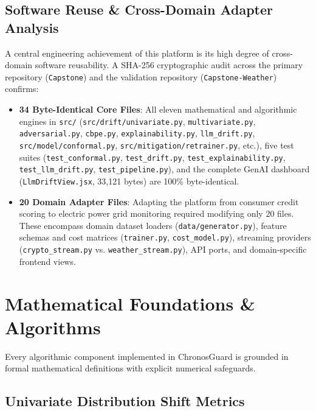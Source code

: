 \documentclass[conference]{IEEEtran}
\begin{document}
\subsection{Software Reuse \& Cross-Domain Adapter Analysis}
A central engineering achievement of this platform is its high degree of cross-domain software reusability. A SHA-256 cryptographic audit across the primary repository (\texttt{Capstone}) and the validation repository (\texttt{Capstone-Weather}) confirms:
\begin{itemize}
    \item \textbf{34 Byte-Identical Core Files}: All eleven mathematical and algorithmic engines in \texttt{src/} (\texttt{src/drift/univariate.py}, \texttt{multivariate.py}, \texttt{adversarial.py}, \texttt{cbpe.py}, \texttt{explainability.py}, \texttt{llm\_drift.py}, \texttt{src/model/conformal.py}, \texttt{src/mitigation/retrainer.py}, etc.), five test suites (\texttt{test\_conformal.py}, \texttt{test\_drift.py}, \texttt{test\_explainability.py}, \texttt{test\_llm\_drift.py}, \texttt{test\_pipeline.py}), and the complete GenAI dashboard (\texttt{LlmDriftView.jsx}, 33,121 bytes) are 100\% byte-identical.
    \item \textbf{20 Domain Adapter Files}: Adapting the platform from consumer credit scoring to electric power grid monitoring required modifying only 20 files. These encompass domain dataset loaders (\texttt{data/generator.py}), feature schemas and cost matrices (\texttt{trainer.py}, \texttt{cost\_model.py}), streaming providers (\texttt{crypto\_stream.py} vs. \texttt{weather\_stream.py}), API ports, and domain-specific frontend views.
\end{itemize}

\section{Mathematical Foundations \& Algorithms}

Every algorithmic component implemented in ChronosGuard is grounded in formal mathematical definitions with explicit numerical safeguards.

\subsection{Univariate Distribution Shift Metrics}
\end{document}
